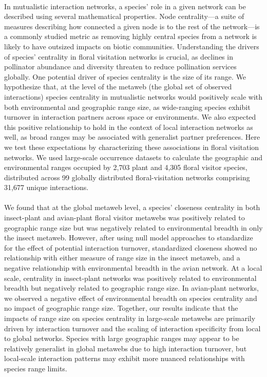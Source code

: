 \documentclass[12pt]{article}
\begin{document}
\paragraph{}
In mutualistic interaction networks, a species’ role in a given network can be described using several mathematical properties. Node centrality—a suite of measures describing how connected a given node is to the rest of the network—is a commonly studied metric as removing highly central species from a network is likely to have outsized impacts on biotic communities. Understanding the drivers of species' centrality in floral visitation networks is crucial, as declines in pollinator abundance and diversity threaten to reduce pollination services globally. One potential driver of species centrality is the size of its range. We hypothesize that, at the level of the metaweb (the global set of observed interactions) species centrality in mutualistic networks would positively scale with both environmental and geographic range size, as wide-ranging species exhibit turnover in interaction partners across space or environments. We also expected this positive relationship to hold in the context of local interaction networks as well, as broad ranges may be associated with generalist partner preferences. Here we test these expectations by characterizing these associations in floral visitation networks. We used large-scale occurrence datasets to calculate the geographic and environmental ranges occupied by 2,703 plant and 4,305 floral visitor species, distributed across 99 globally distributed floral-visitation networks comprising 31,677 unique interactions.

\paragraph{}
We found that at the global metaweb level, a species’ closeness centrality in both insect-plant and avian-plant floral visitor metawebs was positively related to geographic range size but was negatively related to environmental breadth in only the insect metaweb. However, after using null model approaches to standardize for the effect of potential interaction turnover, standardized closeness showed no relationship with either measure of range size in the insect metaweb, and a negative relationship with environmental breadth in the avian network. At a local scale, centrality in insect-plant networks was positively related to environmental breadth but negatively related to geographic range size. In avian-plant networks, we observed a negative effect of environmental breadth on species centrality and no impact of geographic range size. Together, our results indicate that the impacts of range size on species centrality in large-scale metawebs are primarily driven by interaction turnover and the scaling of interaction specificity from local to global networks. Species with large geographic ranges may appear to be relatively generalist in global metawebs due to high interaction turnover, but local-scale interaction patterns may exhibit more nuanced relationships with species range limits.
\end{document}
